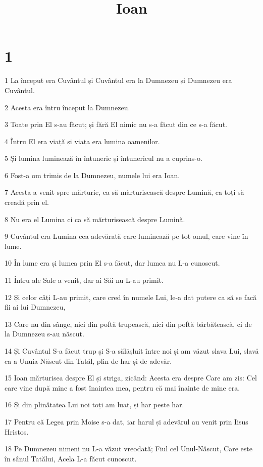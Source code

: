 

\title{Ioan}


\chapter{1}

\par 1 La început era Cuvântul și Cuvântul era la Dumnezeu și Dumnezeu era Cuvântul.
\par 2 Acesta era întru început la Dumnezeu.
\par 3 Toate prin El s-au făcut; și fără El nimic nu s-a făcut din ce s-a făcut.
\par 4 Întru El era viață și viața era lumina oamenilor.
\par 5 Și lumina luminează în întuneric și întunericul nu a cuprins-o.
\par 6 Fost-a om trimis de la Dumnezeu, numele lui era Ioan.
\par 7 Acesta a venit spre mărturie, ca să mărturisească despre Lumină, ca toți să creadă prin el.
\par 8 Nu era el Lumina ci ca să mărturisească despre Lumină.
\par 9 Cuvântul era Lumina cea adevărată care luminează pe tot omul, care vine în lume.
\par 10 În lume era și lumea prin El s-a făcut, dar lumea nu L-a cunoscut.
\par 11 Întru ale Sale a venit, dar ai Săi nu L-au primit.
\par 12 Și celor câți L-au primit, care cred în numele Lui, le-a dat putere ca să se facă fii ai lui Dumnezeu,
\par 13 Care nu din sânge, nici din poftă trupească, nici din poftă bărbătească, ci de la Dumnezeu s-au născut.
\par 14 Și Cuvântul S-a făcut trup și S-a sălășluit între noi și am văzut slava Lui, slavă ca a Unuia-Născut din Tatăl, plin de har și de adevăr.
\par 15 Ioan mărturisea despre El și striga, zicând: Acesta era despre Care am zis: Cel care vine după mine a fost înaintea mea, pentru că mai înainte de mine era.
\par 16 Și din plinătatea Lui noi toți am luat, și har peste har.
\par 17 Pentru că Legea prin Moise s-a dat, iar harul și adevărul au venit prin Iisus Hristos.
\par 18 Pe Dumnezeu nimeni nu L-a văzut vreodată; Fiul cel Unul-Născut, Care este în sânul Tatălui, Acela L-a făcut cunoscut.

